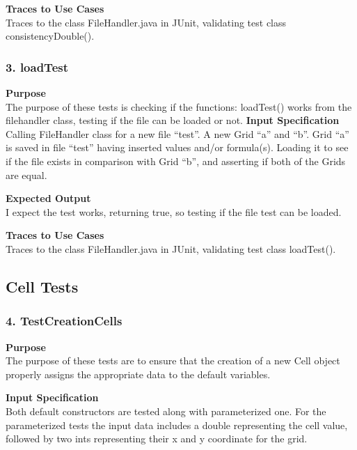 \documentclass[12pt]{article}
\begin{document}
\noindent
{\bf Traces to Use Cases}\\
Traces to the class FileHandler.java in JUnit, validating test class consistencyDouble().

\subsubsection{3. loadTest} \label{tc:1}

\noindent
{\bf Purpose}\\
The purpose of these tests is checking if the functions: loadTest() works from the filehandler class, testing if the file can be loaded or not.
\noindent
{\bf Input Specification}\\
Calling FileHandler class for a new file “test”. A new Grid “a” and “b”.  Grid “a” is saved in file “test” having inserted values and/or formula(s).  Loading it to see if the file exists in comparison with Grid “b”, and asserting if both of the Grids are equal.

\noindent
{\bf Expected Output}\\
I expect the test works, returning true, so testing if the file test can be loaded.  

\noindent
{\bf Traces to Use Cases}\\
Traces to the class FileHandler.java in JUnit, validating test class loadTest().

\subsection{Cell Tests}
\subsubsection{4. TestCreationCells} \label{tc:1}

\noindent
{\bf Purpose}\\
The purpose of these tests are to ensure that the creation of a new Cell object properly assigns the appropriate data to the default variables. 

\noindent
{\bf Input Specification}\\
Both default constructors are tested along with parameterized one. For the parameterized tests the input data includes a double representing the cell value, followed by two ints representing their x and y coordinate for the grid. 
\end{document}
